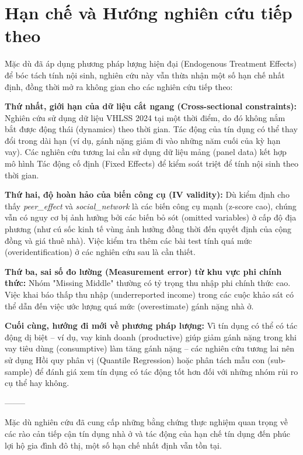 \documentclass[12pt,a4paper]{report}
\begin{document}
\section{Hạn chế và Hướng nghiên cứu tiếp theo}

Mặc dù đã áp dụng phương pháp lượng hiện đại (Endogenous Treatment Effects) để bóc tách tính nội sinh, nghiên cứu này vẫn thừa nhận một số hạn chế nhất định, đồng thời mở ra không gian cho các nghiên cứu tiếp theo:

\textbf{Thứ nhất, giới hạn của dữ liệu cắt ngang (Cross-sectional constraints):} Nghiên cứu sử dụng dữ liệu VHLSS 2024 tại một thời điểm, do đó không nắm bắt được động thái (dynamics) theo thời gian. Tác động của tín dụng có thể thay đổi trong dài hạn (ví dụ, gánh nặng giảm đi vào những năm cuối của kỳ hạn vay). Các nghiên cứu tương lai cần sử dụng dữ liệu mảng (panel data) kết hợp mô hình Tác động cố định (Fixed Effects) để kiểm soát triệt để tính nội sinh theo thời gian.

\textbf{Thứ hai, độ hoàn hảo của biến công cụ (IV validity):} Dù kiểm định cho thấy \textit{peer\_effect} và \textit{social\_network} là các biến công cụ mạnh (z-score cao), chúng vẫn có nguy cơ bị ảnh hưởng bởi các biến bỏ sót (omitted variables) ở cấp độ địa phương (như cú sốc kinh tế vùng ảnh hưởng đồng thời đến quyết định của cộng đồng và giá thuê nhà). Việc kiểm tra thêm các bài test tính quá mức (overidentification) ở các nghiên cứu sau là cần thiết.

\textbf{Thứ ba, sai số đo lường (Measurement error) từ khu vực phi chính thức:} Nhóm "Missing Middle" thường có tỷ trọng thu nhập phi chính thức cao. Việc khai báo thấp thu nhập (underreported income) trong các cuộc khảo sát có thể dẫn đến việc ước lượng quá mức (overestimate) gánh nặng nhà ở.

\textbf{Cuối cùng, hướng đi mới về phương pháp lượng:} Vì tín dụng có thể có tác động dị biệt -- ví dụ, vay kinh doanh (productive) giúp giảm gánh nặng trong khi vay tiêu dùng (consumptive) làm tăng gánh nặng -- các nghiên cứu tương lai nên sử dụng Hồi quy phân vị (Quantile Regression) hoặc phân tách mẫu con (sub-sample) để đánh giá xem tín dụng có tác động tốt hơn đối với những nhóm rủi ro cụ thể hay không.

--------

	Mặc dù nghiên cứu đã cung cấp những bằng chứng thực nghiệm quan trọng về các rào cản tiếp cận tín dụng nhà ở và tác động của hạn chế tín dụng đến phúc lợi hộ gia đình đô thị, một số hạn chế nhất định vẫn tồn tại.
	
\end{document}
